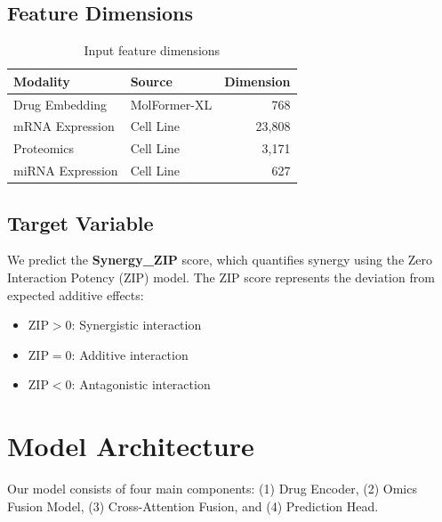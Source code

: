 \documentclass[10pt,twocolumn]{article}
\begin{document}
\subsection{Feature Dimensions}

\begin{table}[h]
\centering
\caption{Input feature dimensions}
\label{tab:features}
\begin{tabular}{@{}llr@{}}
\toprule
\textbf{Modality} & \textbf{Source} & \textbf{Dimension} \\
\midrule
Drug Embedding & MolFormer-XL & 768 \\
mRNA Expression & Cell Line & 23,808 \\
Proteomics & Cell Line & 3,171 \\
miRNA Expression & Cell Line & 627 \\
\bottomrule
\end{tabular}
\end{table}

\subsection{Target Variable}

We predict the \textbf{Synergy\_ZIP} score, which quantifies synergy using the Zero Interaction Potency (ZIP) model. The ZIP score represents the deviation from expected additive effects:
\begin{itemize}
    \item $\text{ZIP} > 0$: Synergistic interaction
    \item $\text{ZIP} = 0$: Additive interaction
    \item $\text{ZIP} < 0$: Antagonistic interaction
\end{itemize}

\section{Model Architecture}

Our model consists of four main components: (1) Drug Encoder, (2) Omics Fusion Model, (3) Cross-Attention Fusion, and (4) Prediction Head.
\end{document}
